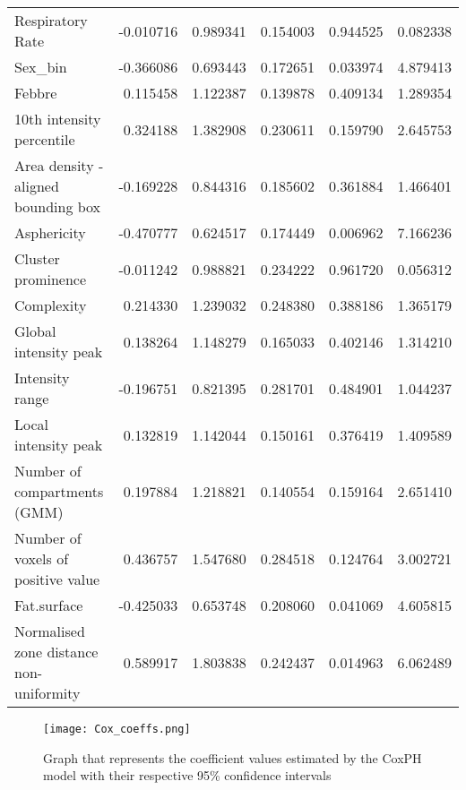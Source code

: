 \begin{table}
\begin{adjustbox}{width=\linewidth}
\begin{tabular}{|lrrrrr|}
Respiratory Rate                      			& -0.010716 &   0.989341 &  0.154003 &         0.944525 &  0.082338 \\
Sex\_bin                                 			& -0.366086 &   0.693443 &  0.172651 &         0.033974 &  4.879413 \\
Febbre                                     		  	&  0.115458 &   1.122387 &  0.139878 &         0.409134 &  1.289354 \\
10th intensity percentile             			&  0.324188 &   1.382908 &  0.230611 &        0.159790 &  2.645753 \\
Area density - aligned bounding box     	& -0.169228 &   0.844316 &  0.185602 &        0.361884 &  1.466401 \\
Asphericity                             			& -0.470777 &   0.624517 &  0.174449 &         0.006962 &  7.166236 \\
Cluster prominence                      		& -0.011242 &   0.988821 &  0.234222 &        0.961720 &  0.056312 \\
Complexity                              			&  0.214330 &   1.239032 &  0.248380 &         0.388186 &  1.365179 \\
Global intensity peak                   		&  0.138264 &   1.148279 &  0.165033 &         0.402146 &  1.314210 \\
Intensity range                        			& -0.196751 &   0.821395 &  0.281701 &        0.484901 &  1.044237 \\
Local intensity peak                    			&  0.132819 &   1.142044 &  0.150161 &        0.376419 &  1.409589 \\
Number of compartments (GMM)            	&  0.197884 &   1.218821 &  0.140554 &         0.159164 &  2.651410 \\
Number of voxels of positive value      		&  0.436757 &   1.547680 &  0.284518 &         0.124764 &  3.002721 \\
Fat.surface                             			& -0.425033 &   0.653748 &  0.208060 &        0.041069 &  4.605815 \\
Normalised zone distance non-uniformity 	&  0.589917 &   1.803838 &  0.242437 &         0.014963 &  6.062489 \\
\bottomrule
\end{tabular}
\end{adjustbox}
\end{table}

\begin{figure}
\caption{Graph that represents the coefficient values estimated by the CoxPH model with their respective 95\% confidence intervals}
\texttt{[image: Cox\_coeffs.png]}
\end{figure}

